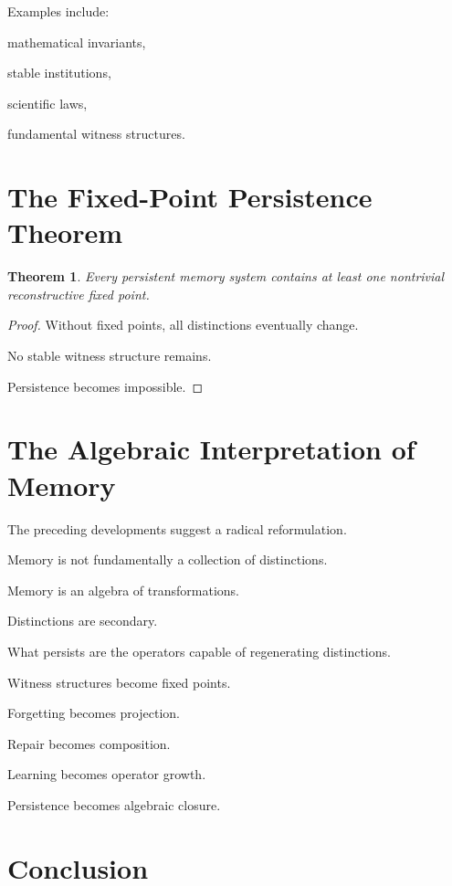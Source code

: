 \documentclass[12pt,oneside]{book}
\theoremstyle{plain} \newtheorem{theorem}{Theorem}[chapter] \newtheorem{lemma}[theorem]{Lemma} \newtheorem{proposition}[theorem]{Proposition} \newtheorem{corollary}[theorem]{Corollary}
\theoremstyle{definition} \newtheorem{definition}[theorem]{Definition} \newtheorem{axiom}[theorem]{Axiom} \newtheorem{construction}[theorem]{Construction}
\theoremstyle{remark} \newtheorem{remark}[theorem]{Remark} \newtheorem{example}[theorem]{Example}
\begin{document}
Examples include:

mathematical invariants,

stable institutions,

scientific laws,

fundamental witness structures.

\section{The Fixed-Point Persistence Theorem}

\begin{theorem}

Every persistent memory system contains at least one nontrivial reconstructive fixed point.

\end{theorem}

\begin{proof}

Without fixed points, all distinctions eventually change.

No stable witness structure remains.

Persistence becomes impossible.

\end{proof}

\section{The Algebraic Interpretation of Memory}

The preceding developments suggest a radical reformulation.

Memory is not fundamentally a collection of distinctions.

Memory is an algebra of transformations.

Distinctions are secondary.

What persists are the operators capable of regenerating distinctions.

Witness structures become fixed points.

Forgetting becomes projection.

Repair becomes composition.

Learning becomes operator growth.

Persistence becomes algebraic closure.

\section{Conclusion}
\end{document}
